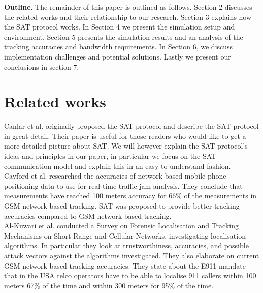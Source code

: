 \documentclass[10pt,titlepage]{article}
\begin{document}
\textbf{Outline}. The remainder of this paper is outlined as follows. Section 2 discusses the related works and their relationship to our research. Section 3 explains how the SAT protocol works. In Section 4 we present the simulation setup and environment. Section 5 presents the simulation results and an analysis of the tracking accuracies and bandwidth requirements. In Section 6, we discuss implementation challenges and potential solutions. Lastly we present our conclusions in section 7.\\



%

\section{Related works}
% 

Canlar et al. \cite{SAT} originally proposed the SAT protocol and describe the SAT protocol in great detail. Their paper is useful for those readers who would like to get a more detailed picture about SAT. We will however explain the SAT protocol's ideas and principles in our paper, in particular we focus on the SAT communication model and explain this in an easy to understand fashion.\\

Cayford et al. \cite{CELLPHONETRACKING} researched the accuracies of network based
mobile phone positioning data to use for real time traffic jam analysis. They conclude that measurements have reached 100 meters accuracy for 66\% of the measurements in GSM network based tracking. SAT was proposed to provide better tracking accuracies compared to GSM network based tracking.\\

Al-Kuwari et al. \cite{ALKUWARI} conducted a Survey on Forensic Localisation and Tracking Mechanisms on Short-Range and Cellular Networks, investigating localisation algorithms. In particular they look at trustworthiness, accuracies, and possible attack vectors against the algorithms investigated. They also elaborate on current GSM network based tracking accuracies. They state about the E911 mandate that in the USA telco operators have to be able to localise 911 callers within 100 meters 67\% of the time and within 300 meters for 95\% of the time.\\
\end{document}
